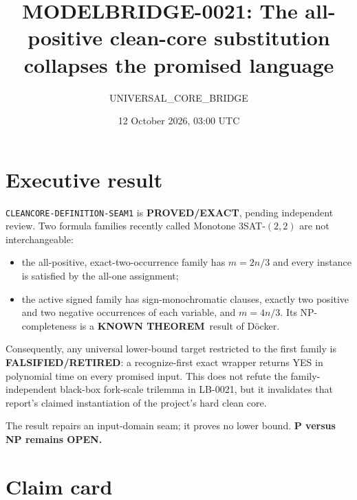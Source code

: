 \documentclass[11pt]{article}
\title{MODELBRIDGE-0021: The all-positive clean-core substitution collapses the promised language}
\author{UNIVERSAL\_CORE\_BRIDGE}
\date{12 October 2026, 03:00 UTC}
\newcommand{\EXACT}{\textbf{PROVED/EXACT}}
\newcommand{\KNOWN}{\textbf{KNOWN THEOREM}}
\newcommand{\RETIRED}{\textbf{FALSIFIED/RETIRED}}
\begin{document}
\maketitle

\section*{Executive result}

\texttt{CLEANCORE-DEFINITION-SEAM1} is \EXACT, pending independent
review.  Two formula families recently called Monotone
$3$SAT-$(2,2)$ are not interchangeable:
\begin{itemize}
\item the all-positive, exact-two-occurrence family has
$m=2n/3$ and every instance is satisfied by the all-one assignment;
\item the active signed family has sign-monochromatic clauses, exactly two
positive and two negative occurrences of each variable, and $m=4n/3$.
Its NP-completeness is a \KNOWN\ result of D\"ocker.
\end{itemize}
Consequently, any universal lower-bound target restricted to the first
family is \RETIRED: a recognize-first exact wrapper returns YES in
polynomial time on every promised input.  This does not refute the
family-independent black-box fork-scale trilemma in LB-0021, but it
invalidates that report's claimed instantiation of the project's hard clean
core.

The result repairs an input-domain seam; it proves no lower bound.
\textbf{P versus NP remains OPEN.}

\section{Claim card}
\end{document}
